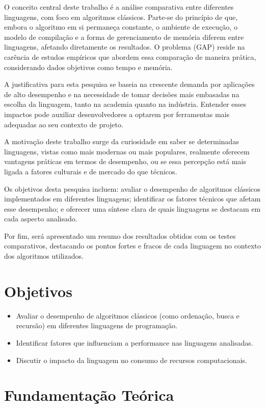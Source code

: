 \documentclass[12pt,oneside,a4paper]{report}
\begin{document}
O conceito central deste trabalho é a análise comparativa entre diferentes linguagens, com foco em algoritmos clássicos. Parte-se do princípio de que, embora o algoritmo em si permaneça constante, o ambiente de execução, o modelo de compilação e a forma de gerenciamento de memória diferem entre linguagens, afetando diretamente os resultados. O problema (GAP) reside na carência de estudos empíricos que abordem essa comparação de maneira prática, considerando dados objetivos como tempo e memória.

A justificativa para esta pesquisa se baseia na crescente demanda por aplicações de alto desempenho e na necessidade de tomar decisões mais embasadas na escolha da linguagem, tanto na academia quanto na indústria. Entender esses impactos pode auxiliar desenvolvedores a optarem por ferramentas mais adequadas ao seu contexto de projeto.

A motivação deste trabalho surge da curiosidade em saber se determinadas linguagens, vistas como mais modernas ou mais populares, realmente oferecem vantagens práticas em termos de desempenho, ou se essa percepção está mais ligada a fatores culturais e de mercado do que técnicos.

Os objetivos desta pesquisa incluem: avaliar o desempenho de algoritmos clássicos implementados em diferentes linguagens; identificar os fatores técnicos que afetam esse desempenho; e oferecer uma síntese clara de quais linguagens se destacam em cada aspecto analisado.

Por fim, será apresentado um resumo dos resultados obtidos com os testes comparativos, destacando os pontos fortes e fracos de cada linguagem no contexto dos algoritmos utilizados.

\chapter{Objetivos}
\begin{itemize}
    \item Avaliar o desempenho de algoritmos clássicos (como ordenação, busca e recursão) em diferentes linguagens de programação.
    \item Identificar fatores que influenciam a performance nas linguagens analisadas.
    \item Discutir o impacto da linguagem no consumo de recursos computacionais.
\end{itemize}

\chapter{Fundamentação Teórica}
\end{document}
